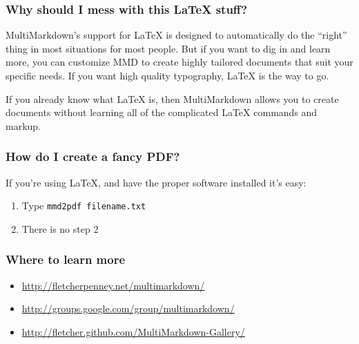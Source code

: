 \begin{frame}

\frametitle{Why should I mess with this LaTeX stuff?}
\label{whyshouldimesswiththislatexstuff}

MultiMarkdown's support for LaTeX is designed to automatically do the ``right''
thing in most situations for most people. But if you want to dig in and learn
more, you can customize MMD to create highly tailored documents that suit your
specific needs. If you want high quality typography, LaTeX is the way to go.

If you already know what LaTeX is, then MultiMarkdown allows you to create
documents without learning all of the complicated LaTeX commands and markup.

\end{frame}

\begin{frame}

\frametitle{How do I create a fancy PDF?}
\label{howdoicreateafancypdf}

If you're using LaTeX, and have the proper software installed it's easy:

\begin{enumerate}
\item Type \texttt{mmd2pdf filename.txt}

\item There is no step 2

\end{enumerate}

\end{frame}

\begin{frame}

\frametitle{Where to learn more}
\label{wheretolearnmore}

\begin{itemize}
\item \href{http://fletcherpenney.net/multimarkdown/}{http:\slash \slash fletcherpenney.net\slash multimarkdown\slash }

\item \href{http://groups.google.com/group/multimarkdown/}{http:\slash \slash groups.google.com\slash group\slash multimarkdown\slash }

\item \href{http://fletcher.github.com/MultiMarkdown-Gallery/}{http:\slash \slash fletcher.github.com\slash MultiMarkdown-Gallery\slash }

\end{itemize}

\end{frame}


